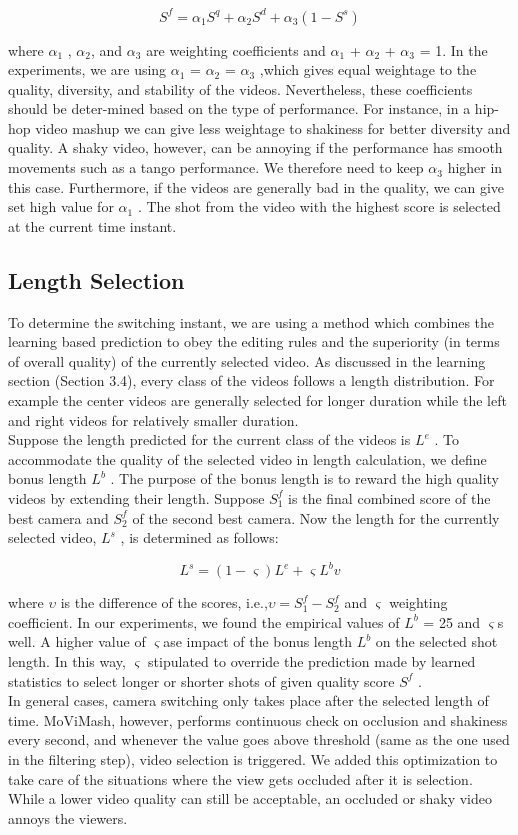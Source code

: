 \documentclass{sig-alternate}
\begin{document}
$$S^f = \alpha_1 S^q + \alpha_2 S^d + \alpha_3 (1 - S^s )$$

where $\alpha_1$ , $\alpha_2 $, and $\alpha_3$ are weighting coefficients and $\alpha_ 1$ + $\alpha_2$ + $\alpha_3$ = 1. In the experiments, we are using $\alpha_1$ = $\alpha_2$ = $\alpha_3$ ,which gives equal weightage to the quality, diversity, and stability of the videos. Nevertheless, these coefficients should be deter-mined based on the type of performance. For instance, in a hip-hop
video mashup we can give less weightage to shakiness for better diversity and quality. A shaky video, however, can be annoying if the
performance has smooth movements such as a tango performance.
We therefore need to keep $\alpha_3$ higher in this case. Furthermore, if
the videos are generally bad in the quality, we can give set high
value for $\alpha_1$ . The shot from the video with the highest score is
selected at the current time instant.


\subsection{Length Selection}




To determine the switching instant, we are using a method which
combines the learning based prediction to obey the editing rules and
the superiority (in terms of overall quality) of the currently selected
video. As discussed in the learning section (Section 3.4), every
class of the videos follows a length distribution. For example the
center videos are generally selected for longer duration while the
left and right videos for relatively smaller duration.\\
Suppose the length predicted for the current class of the videos
is $L^e$ . To accommodate the quality of the selected video in length
calculation, we define bonus length $L^b$ . The purpose of the bonus
length is to reward the high quality videos by extending their length.
Suppose $S_1^f$ is the final combined score of the best camera and $S_2^f$
of the second best camera. Now the length for the currently selected
video, $L^s$ , is determined as follows:

$$L^s = (1 - \varsigma)L^e + \varsigma L^b v$$ 

where $υ$ is the difference of the scores, i.e.,$ υ = S^f_1 - S^f_2$
and $\varsigma$
weighting coefficient. In our experiments, we found the empirical
values of $L^b$ = 25 and $\varsigma$s well. A higher value of
$\varsigma$ase impact of the bonus length $L^b$ on the selected shot
length. In this way, $\varsigma$ stipulated to override the prediction
made by learned statistics to select longer or shorter shots of given
quality score $S^f$ .\\
In general cases, camera switching only takes place after the selected length of time. MoViMash, however, performs continuous
check on occlusion and shakiness every second, and whenever the
value goes above threshold (same as the one used in the filtering
step), video selection is triggered. We added this optimization to
take care of the situations where the view gets occluded after it is
selection. While a lower video quality can still be acceptable, an
occluded or shaky video annoys the viewers.
\end{document}
